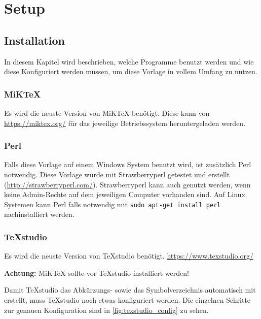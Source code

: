 %
%

\chapter{Setup}
\section{Installation}
In diesem Kapitel wird beschrieben, welche Programme benutzt werden und wie diese Konfiguriert werden müssen, um diese Vorlage in vollem Umfang zu nutzen.

\subsection{MiKTeX}
Es wird die neuste Version von MiKTeX benötigt. Diese kann von \url{https://miktex.org/} für das jeweilige Betriebssystem heruntergeladen werden. 

\subsection{Perl}
Falls diese Vorlage auf einem Windows System benutzt wird, ist zusätzlich Perl notwendig. Diese Vorlage wurde mit Strawberryperl getestet und erstellt (\url{http://strawberryperl.com/}). Strawberryperl kann auch genutzt werden, wenn keine Admin-Rechte auf dem jeweiligen Computer vorhanden sind.
Auf Linux Systemen kann Perl falls notwendig mit \verb|sudo apt-get install perl| nachinstalliert werden.

\subsection{TeXstudio}\label{sec:texstudioconfig}
Es wird die neuste Version von TeXstudio benötigt. \url{https://www.texstudio.org/}

\textbf{Achtung:} MiKTeX sollte vor TeXstudio installiert werden!

Damit TeXstudio das Abkürzungs- sowie das Symbolverzeichnis automatisch mit erstellt, muss TeXstudio noch etwas konfiguriert werden. Die einzelnen Schritte zur genauen Konfiguration sind in \autoref{fig:texstudio_config} zu sehen.
 
